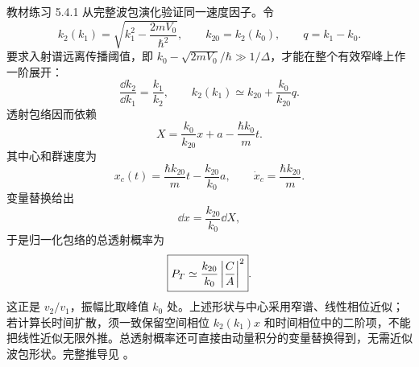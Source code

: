 教材练习 5.4.1 从完整波包演化验证同一速度因子。令
\begin{equation}
  k_2(k_1)=\sqrt{k_1^2-\frac{2mV_0}{\hbar^2}},
  \qquad
  k_{20}=k_2(k_0),
  \qquad
  q=k_1-k_0.
\end{equation}
要求入射谱远离传播阈值，即 $k_0-\sqrt{2mV_0}/\hbar\gg1/\Delta$，才能在整个有效窄峰上作一阶展开：
\begin{equation}
  \frac{\dd k_2}{\dd k_1}=\frac{k_1}{k_2},
  \qquad
  k_2(k_1)\simeq k_{20}+\frac{k_0}{k_{20}}q.
  \label{eq:QM-C05-S04-k2-linearization}
\end{equation}
透射包络因而依赖
\begin{equation}
  X=\frac{k_0}{k_{20}}x+a-\frac{\hbar k_0}{m}t.
  \label{eq:QM-C05-S04-transmitted-envelope-coordinate}
\end{equation}
其中心和群速度为
\begin{equation}
  x_c(t)=\frac{\hbar k_{20}}{m}t-\frac{k_{20}}{k_0}a,
  \qquad
  \dot x_c=\frac{\hbar k_{20}}m.
  \label{eq:QM-C05-S04-transmitted-center}
\end{equation}
变量替换给出
\begin{equation}
  \dd x=\frac{k_{20}}{k_0}\dd X,
  \label{eq:QM-C05-S04-packet-jacobian}
\end{equation}
于是归一化包络的总透射概率为
\begin{equation}
  \boxed{
  P_T\simeq\frac{k_{20}}{k_0}\left|\frac CA\right|^2}.
  \label{eq:QM-C05-S04-packet-transmission}
\end{equation}
这正是 $v_2/v_1$，振幅比取峰值 $k_0$ 处。上述形状与中心采用窄谱、线性相位近似；若计算长时间扩散，须一致保留空间相位 $k_2(k_1)x$ 和时间相位中的二阶项，不能把线性近似无限外推。总透射概率还可直接由动量积分的变量替换得到，无需近似波包形状。完整推导见
。



